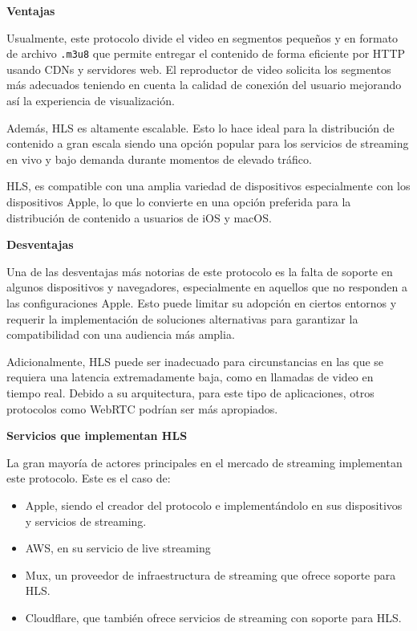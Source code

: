 \textbf{Ventajas}

Usualmente, este protocolo divide el video en segmentos pequeños y en formato de archivo \lstinline|.m3u8| que permite entregar el contenido de forma eficiente por HTTP usando CDNs y servidores web. El reproductor de video solicita los segmentos más adecuados teniendo en cuenta la calidad de conexión del usuario mejorando así la experiencia de visualización. 

Además, HLS es altamente escalable. Esto lo hace ideal para la distribución de contenido a gran escala siendo una opción popular para los servicios de streaming en vivo y bajo demanda durante momentos de elevado tráfico.

HLS, es compatible con una amplia variedad de dispositivos especialmente con los dispositivos Apple, lo que lo convierte en una opción preferida para la distribución de contenido a usuarios de iOS y macOS.

\textbf{Desventajas}

Una de las desventajas más notorias de este protocolo es la falta de soporte en algunos dispositivos y navegadores, especialmente en aquellos que no responden a las configuraciones Apple. Esto puede limitar su adopción en ciertos entornos y requerir la implementación de soluciones alternativas para garantizar la compatibilidad con una audiencia más amplia. \cite{hls-support}

Adicionalmente, HLS puede ser inadecuado para circunstancias en las que se requiera una latencia extremadamente baja, como en llamadas de video en tiempo real. Debido a su arquitectura, para este tipo de aplicaciones, otros protocolos como WebRTC podrían ser más apropiados. \cite{hls-latency}

\textbf{Servicios que implementan HLS}

La gran mayoría de actores principales en el mercado de streaming implementan este protocolo. Este es el caso de:

\begin{itemize}
    \item Apple, siendo el creador del protocolo e implementándolo en sus dispositivos y servicios de streaming.
    \item AWS, en su servicio de live streaming
    \item Mux, un proveedor de infraestructura de streaming que ofrece soporte para HLS.
    \item Cloudflare, que también ofrece servicios de streaming con soporte para HLS.
\end{itemize}


